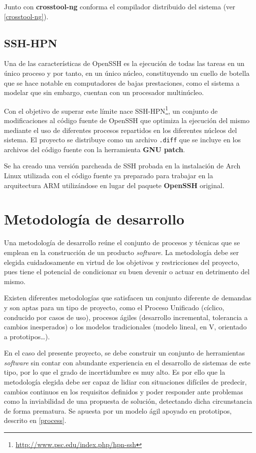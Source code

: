 Junto con \textbf{crosstool-ng} conforma el compilador distribuido del sistema (ver \ref{crosstool-ng}).

\subsection{SSH-HPN}
\label{ssh-hpn}
Una de las características de OpenSSH es la ejecución de todas las tareas en un único proceso y por tanto, en un único núcleo, constituyendo un cuello de botella que se hace notable en computadores de bajas prestaciones, como el sistema a modelar que sin embargo, cuentan con un procesador multinúcleo.

Con el objetivo de superar este límite nace SSH-HPN\footnote{\href{http://www.psc.edu/index.php/hpn-ssh}{http://www.psc.edu/index.php/hpn-ssh}}, un conjunto de modificaciones al código fuente de OpenSSH que optimiza la ejecución del mismo mediante el uso de diferentes procesos repartidos en los diferentes núcleos del sistema. El proyecto se distribuye como un archivo \texttt{.diff} que se incluye en los archivos del código fuente con la herramienta \textbf{GNU patch}.

Se ha creado una versión parcheada de SSH probada en la instalación de Arch Linux utilizada con el código fuente ya preparado para trabajar en la arquitectura ARM utilizándose en lugar del paquete \textbf{OpenSSH} original.


\section{Metodología de desarrollo}

Una metodología de desarrollo reúne el conjunto de procesos y técnicas que se emplean en la construcción de un producto \textit{software}. La metodología debe ser elegida cuidadosamente en virtud de los objetivos y restricciones del proyecto, pues tiene el potencial de condicionar su buen devenir o actuar en detrimento del mismo.

Existen diferentes metodologías que satisfacen un conjunto diferente de demandas y son aptas para un tipo de proyecto, como el Proceso Unificado (cíclico, conducido por casos de uso), procesos ágiles (desarrollo incremental, tolerancia a cambios inesperados) o los modelos tradicionales (modelo lineal, en V, orientado a prototipos\dots).

En el caso del presente proyecto, se debe construir un conjunto de herramientas \textit{software} sin contar con abundante experiencia en el desarrollo de sistemas de este tipo, por lo que el grado de incertidumbre es muy alto. Es por ello que la metodología elegida debe ser capaz de lidiar con situaciones difíciles de predecir, cambios continuos en los requisitos definidos y poder responder ante problemas como la inviabilidad de una propuesta de solución, detectando dicha circunstancia de forma prematura. Se apuesta por un modelo ágil apoyado en prototipos, descrito en \ref{process}.
